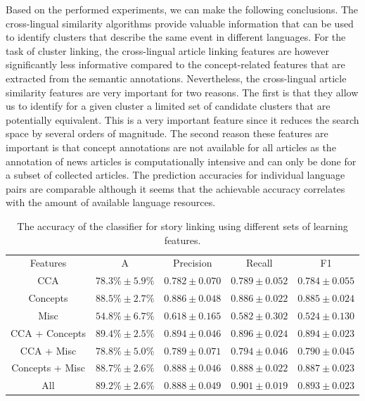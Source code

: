 \documentclass[twoside,11pt]{article}
\begin{document}
Based on the performed experiments, we can make the following conclusions. The cross-lingual similarity algorithms provide valuable information that can be used to identify clusters that describe the same event in different languages. For the task of cluster linking, the cross-lingual article linking features are however significantly less informative compared to the concept-related features that are extracted from the semantic annotations. Nevertheless, the cross-lingual article similarity features are very important for two reasons. The first  is that they allow us to identify for a given cluster a limited set of candidate clusters that are potentially equivalent. This is a very important feature since it reduces the search space by several orders of magnitude. The second reason these features are important is that concept annotations are not available for all articles as the annotation of news articles is computationally intensive and can only be done for a subset of collected articles. The prediction accuracies for individual language pairs are comparable although it seems that the achievable accuracy correlates with the amount of available language resources.


\begin{table}[h]
\caption{The accuracy of the classifier for story linking using different sets of learning features.}
\label{table:linkingEval}
\begin{center}
\begin{tabular}{|c|c|c|c|c|}
  \hline
  \cline{1-5}
  Features & A & Precision & Recall & F1 \\ \cline{1-5}
  CCA & $78.3\% \pm 5.9\%$ & $0.782 \pm 0.070$ & $0.789 \pm 0.052$ & $0.784 \pm 0.055$ \\ \cline{1-5}
  Concepts & $88.5\% \pm 2.7\%$ & $0.886 \pm 0.048$ & $0.886 \pm 0.022$ & $0.885 \pm 0.024$ \\ \cline{1-5}
  Misc & $54.8\% \pm 6.7\%$ & $0.618 \pm 0.165$ & $0.582 \pm 0.302$ & $0.524 \pm 0.130$ \\ \cline{1-5}
  CCA + Concepts & $89.4\% \pm 2.5\%$ & $0.894 \pm 0.046$ & $0.896 \pm 0.024$ & $0.894 \pm 0.023$ \\ \cline{1-5}
  CCA + Misc & $78.8\% \pm 5.0\%$ & $0.789 \pm 0.071$ & $0.794 \pm 0.046$ & $0.790 \pm 0.045$ \\ \cline{1-5}
  Concepts + Misc & $88.7\% \pm 2.6\%$ & $0.888 \pm 0.046$ & $0.888 \pm 0.022$ & $0.887 \pm 0.023$ \\ \cline{1-5}
  All & $89.2\% \pm 2.6\%$ & $0.888 \pm 0.049$ & $0.901 \pm 0.019$ & $0.893 \pm 0.023$ \\ \cline{1-5}
  \hline
\end{tabular}
\end{center}
\end{table}
\end{document}
